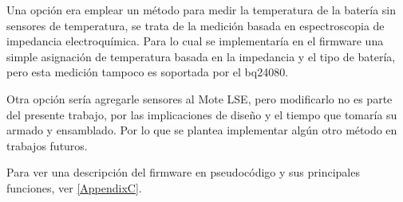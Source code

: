 {Una opción era emplear un método para medir la temperatura de la batería sin sensores de temperatura, se trata de la medición basada en espectroscopia de impedancia electroquímica\citep{metodo}. Para lo cual se implementaría en el firmware una simple asignación de temperatura basada en la impedancia y el tipo de batería, pero esta medición tampoco es soportada por el bq24080.

Otra opción sería agregarle sensores al Mote LSE, pero modificarlo no es parte del presente trabajo, por las implicaciones de diseño y el tiempo que tomaría su armado y ensamblado. Por lo que se plantea implementar algún otro método en trabajos futuros.

Para ver una descripción del firmware en pseudocódigo y sus principales funciones, ver \ref{AppendixC}.






}
